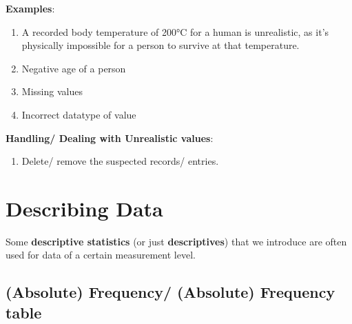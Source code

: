 \vspace{0.3cm}

\textbf{Examples}:
\begin{enumerate}
    \item A recorded body temperature of 200°C for a human is unrealistic, as it’s physically impossible for a person to survive at that temperature. \cite{common/online/chatgpt}

    \item Negative age of a person \cite{common/online/chatgpt}

    \item Missing values \cite{statistics/book/Statistics-for-Data-Scientists/Maurits-Kaptein}

    \item Incorrect datatype of value \cite{statistics/book/Statistics-for-Data-Scientists/Maurits-Kaptein}
\end{enumerate}

\vspace{0.3cm}
\textbf{Handling/ Dealing with Unrealistic values}:
\begin{enumerate}
    \item Delete/ remove the suspected records/ entries. \cite{statistics/book/Statistics-for-Data-Scientists/Maurits-Kaptein}
    
\end{enumerate}





\section{Describing Data \cite{statistics/book/Statistics-for-Data-Scientists/Maurits-Kaptein}} \label{Data/Describing Data}

Some \textbf{descriptive statistics}\label{Data/Describing Data/descriptive statistics} (or just \textbf{descriptives}\label{Data/Describing Data/descriptives}) that we introduce are often used for data of a certain measurement level. \cite{statistics/book/Statistics-for-Data-Scientists/Maurits-Kaptein}

\subsection{(Absolute) Frequency/ (Absolute) Frequency table \cite{statistics/book/Statistics-for-Data-Scientists/Maurits-Kaptein}}\label{Data/Describing Data/(Absolute) Frequency or (Absolute) Frequency table}

